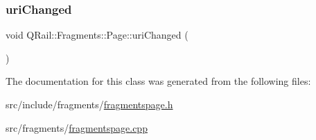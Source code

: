 \subsubsection{\texorpdfstring{uriChanged}{uriChanged}}
{\footnotesize\ttfamily void Q\+Rail\+::\+Fragments\+::\+Page\+::uri\+Changed (\begin{DoxyParamCaption}{ }\end{DoxyParamCaption})\hspace{0.3cm}{\ttfamily [signal]}}



The documentation for this class was generated from the following files\+:\begin{DoxyCompactItemize}
\item 
src/include/fragments/\mbox{\hyperlink{fragmentspage_8h}{fragmentspage.\+h}}\item 
src/fragments/\mbox{\hyperlink{fragmentspage_8cpp}{fragmentspage.\+cpp}}\end{DoxyCompactItemize}
